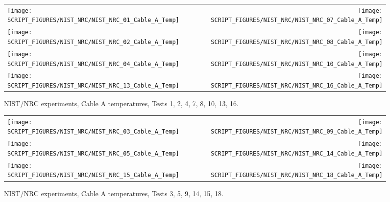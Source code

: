 \newpage

\begin{figure}[p]
\begin{tabular*}{\textwidth}{l@{\extracolsep{\fill}}r}
\texttt{[image: SCRIPT\_FIGURES/NIST\_NRC/NIST\_NRC\_01\_Cable\_A\_Temp]} &
\texttt{[image: SCRIPT\_FIGURES/NIST\_NRC/NIST\_NRC\_07\_Cable\_A\_Temp]} \\
\texttt{[image: SCRIPT\_FIGURES/NIST\_NRC/NIST\_NRC\_02\_Cable\_A\_Temp]} &
\texttt{[image: SCRIPT\_FIGURES/NIST\_NRC/NIST\_NRC\_08\_Cable\_A\_Temp]} \\
\texttt{[image: SCRIPT\_FIGURES/NIST\_NRC/NIST\_NRC\_04\_Cable\_A\_Temp]} &
\texttt{[image: SCRIPT\_FIGURES/NIST\_NRC/NIST\_NRC\_10\_Cable\_A\_Temp]} \\
\texttt{[image: SCRIPT\_FIGURES/NIST\_NRC/NIST\_NRC\_13\_Cable\_A\_Temp]} &
\texttt{[image: SCRIPT\_FIGURES/NIST\_NRC/NIST\_NRC\_16\_Cable\_A\_Temp]}
\end{tabular*}
\caption{NIST/NRC experiments, Cable A temperatures, Tests 1, 2, 4, 7, 8, 10, 13, 16.}
\label{NIST_NRC_Cable_A_Closed}
\end{figure}

\begin{figure}[p]
\begin{tabular*}{\textwidth}{l@{\extracolsep{\fill}}r}
\texttt{[image: SCRIPT\_FIGURES/NIST\_NRC/NIST\_NRC\_03\_Cable\_A\_Temp]} &
\texttt{[image: SCRIPT\_FIGURES/NIST\_NRC/NIST\_NRC\_09\_Cable\_A\_Temp]} \\
\texttt{[image: SCRIPT\_FIGURES/NIST\_NRC/NIST\_NRC\_05\_Cable\_A\_Temp]} &
\texttt{[image: SCRIPT\_FIGURES/NIST\_NRC/NIST\_NRC\_14\_Cable\_A\_Temp]} \\
\texttt{[image: SCRIPT\_FIGURES/NIST\_NRC/NIST\_NRC\_15\_Cable\_A\_Temp]} &
\texttt{[image: SCRIPT\_FIGURES/NIST\_NRC/NIST\_NRC\_18\_Cable\_A\_Temp]}
\end{tabular*}
\caption{NIST/NRC experiments, Cable A temperatures, Tests 3, 5, 9, 14, 15, 18.}
\label{NIST_NRC_Cable_A_Open}
\end{figure}

